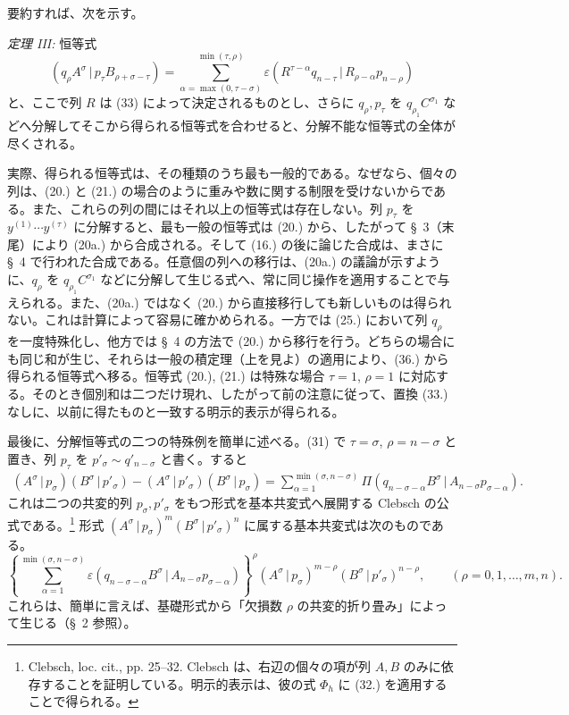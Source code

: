 \documentclass[11pt]{jlreq}
\newcommand{\pair}[2]{(#1\,|\,#2)}
\newcommand{\eps}{\varepsilon}
\begin{document}
要約すれば、次を示す。

\emph{定理 III:} 恒等式
\begin{equation}
 \pair{q_\rho A^\sigma}{p_\tau B_{\rho+\sigma-\tau}}
 =\sum_{\alpha=\max(0,\tau-\sigma)}^{\min(\tau,\rho)}
 \eps\pair{R^{\tau-\alpha}q_{n-\tau}}{R_{\rho-\alpha}p_{n-\rho}}
\tag{36}
\end{equation}
と、ここで列 $R$ は (33) によって決定されるものとし、さらに $q_\rho,p_\tau$ を $q_{\rho_1}C^{\sigma_1}$ などへ分解してそこから得られる恒等式を合わせると、分解不能な恒等式の全体が尽くされる。

実際、得られる恒等式は、その種類のうち最も一般的である。なぜなら、個々の列は、(20.) と (21.) の場合のように重みや数に関する制限を受けないからである。また、これらの列の間にはそれ以上の恒等式は存在しない。列 $p_\tau$ を $y^{(1)}\cdots y^{(\tau)}$ に分解すると、最も一般の恒等式は (20.) から、したがって \S\ 3（末尾）により (20a.) から合成される。そして (16.) の後に論じた合成は、まさに \S\ 4 で行われた合成である。任意個の列への移行は、(20a.) の議論が示すように、$q_\rho$ を $q_{\rho_1}C^{\sigma_1}$ などに分解して生じる式へ、常に同じ操作を適用することで与えられる。また、(20a.) ではなく (20.) から直接移行しても新しいものは得られない。これは計算によって容易に確かめられる。一方では (25.) において列 $q_\rho$ を一度特殊化し、他方では \S\ 4 の方法で (20.) から移行を行う。どちらの場合にも同じ和が生じ、それらは一般の積定理（上を見よ）の適用により、(36.) から得られる恒等式へ移る。恒等式 (20.), (21.) は特殊な場合 $\tau=1$, $\rho=1$ に対応する。そのとき個別和は二つだけ現れ、したがって前の注意に従って、置換 (33.) なしに、以前に得たものと一致する明示的表示が得られる。

最後に、分解恒等式の二つの特殊例を簡単に述べる。(31) で $\tau=\sigma$, $\rho=n-\sigma$ と置き、列 $p_\tau$ を $p'_\sigma\sim q'_{n-\sigma}$ と書く。すると
\begin{equation}
\begin{aligned}
\pair{A^\sigma}{p_\sigma}\pair{B^\sigma}{p'_\sigma}
-\pair{A^\sigma}{p'_\sigma}\pair{B^\sigma}{p_\sigma}
=\sum_{\alpha=1}^{\min(\sigma,n-\sigma)}
\Pi\pair{q_{n-\sigma-\alpha}B^\sigma}{A_{n-\sigma}p_{\sigma-\alpha}}.
\end{aligned}
\tag{37}
\end{equation}
これは二つの共変的列 $p_\sigma,p'_\sigma$ をもつ形式を基本共変式へ展開する Clebsch の公式である。\footnote{Clebsch, loc. cit., pp. 25--32. Clebsch は、右辺の個々の項が列 $A,B$ のみに依存することを証明している。明示的表示は、彼の式 $\Phi_h$ に (32.) を適用することで得られる。} 形式 $\pair{A^\sigma}{p_\sigma}^m\pair{B^\sigma}{p'_\sigma}^n$ に属する基本共変式は次のものである。
\begin{equation}
 \left\{\sum_{\alpha=1}^{\min(\sigma,n-\sigma)}
 \eps\pair{q_{n-\sigma-\alpha}B^\sigma}{A_{n-\sigma}p_{\sigma-\alpha}}
 \right\}^{\rho}
 \pair{A^\sigma}{p_\sigma}^{m-\rho}\pair{B^\sigma}{p'_\sigma}^{n-\rho},
 \qquad (\rho=0,1,\ldots,m,n).
\tag{38}
\end{equation}
これらは、簡単に言えば、基礎形式から「欠損数 $\rho$ の共変的折り畳み」によって生じる（\S\ 2 参照）。
\end{document}

